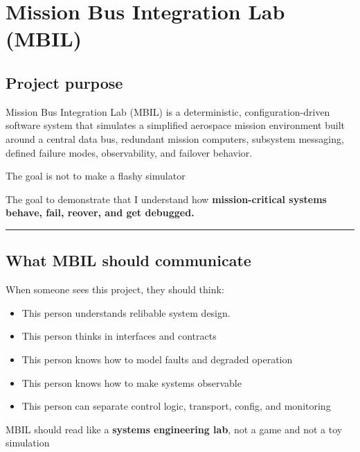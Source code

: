 \documentclass{report}
\begin{document}
\chapter{Mission Bus Integration Lab (MBIL)}
\section{Project purpose}
\vspace{\baselineskip}
Mission Bus Integration Lab (MBIL) is a deterministic, configuration-driven software system that simulates a simplified aerospace mission environment built around a central data bus, redundant mission computers, subsystem messaging, defined failure modes, observability, and failover behavior.
\vspace{\baselineskip}

The goal is not to make a flashy simulator
\vspace{\baselineskip}

The goal to demonstrate that I understand how \textbf{mission-critical systems behave, fail, reover, and get debugged.}

\begin{center}
\rule{0.9\textwidth}{1pt}
\end{center}

\section{What MBIL should communicate}
\vspace{\baselineskip}
When someone sees this project, they should think:
\begin{itemize}
   \item[$\star$] This person understands relibable system design. 
   \item This person thinks in interfaces and contracts
   \item This person knows how to model faults and degraded operation
   \item This person knows how to make systems observable
   \item This person can separate control logic, transport, config, and monitoring
\end{itemize}
MBIL should read like a \textbf{systems engineering lab}, not a game and not a toy simulation 
\end{document}
